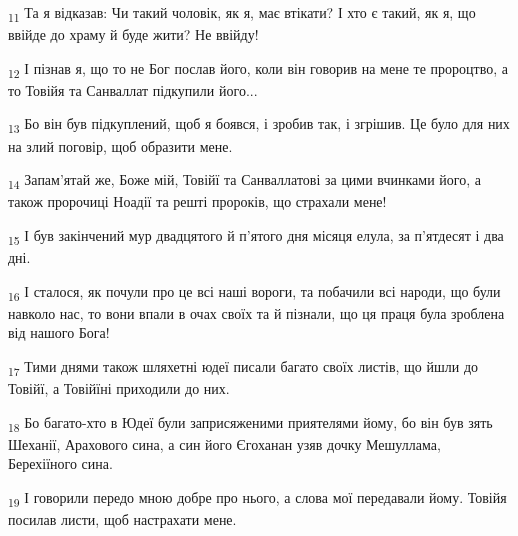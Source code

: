 \begin{tcolorbox}
\textsubscript{11} Та я відказав: Чи такий чоловік, як я, має втікати? І хто є такий, як я, що ввійде до храму й буде жити? Не ввійду!
\end{tcolorbox}
\begin{tcolorbox}
\textsubscript{12} І пізнав я, що то не Бог послав його, коли він говорив на мене те пророцтво, а то Товійя та Санваллат підкупили його...
\end{tcolorbox}
\begin{tcolorbox}
\textsubscript{13} Бо він був підкуплений, щоб я боявся, і зробив так, і згрішив. Це було для них на злий поговір, щоб образити мене.
\end{tcolorbox}
\begin{tcolorbox}
\textsubscript{14} Запам'ятай же, Боже мій, Товійї та Санваллатові за цими вчинками його, а також пророчиці Ноадії та решті пророків, що страхали мене!
\end{tcolorbox}
\begin{tcolorbox}
\textsubscript{15} І був закінчений мур двадцятого й п'ятого дня місяця елула, за п'ятдесят і два дні.
\end{tcolorbox}
\begin{tcolorbox}
\textsubscript{16} І сталося, як почули про це всі наші вороги, та побачили всі народи, що були навколо нас, то вони впали в очах своїх та й пізнали, що ця праця була зроблена від нашого Бога!
\end{tcolorbox}
\begin{tcolorbox}
\textsubscript{17} Тими днями також шляхетні юдеї писали багато своїх листів, що йшли до Товійї, а Товійїні приходили до них.
\end{tcolorbox}
\begin{tcolorbox}
\textsubscript{18} Бо багато-хто в Юдеї були заприсяженими приятелями йому, бо він був зять Шеханії, Арахового сина, а син його Єгоханан узяв дочку Мешуллама, Берехіїного сина.
\end{tcolorbox}
\begin{tcolorbox}
\textsubscript{19} І говорили передо мною добре про нього, а слова мої передавали йому. Товійя посилав листи, щоб настрахати мене.
\end{tcolorbox}
